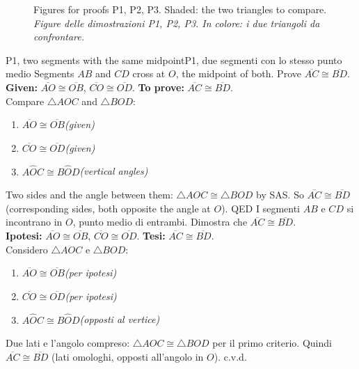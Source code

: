 \documentclass[10pt,a4paper,oneside]{book}
\newcommand{\bicap}[2]{\caption{#1\\{\color{itgreen}\itshape #2}}}
\newcommand{\ang}[3]{#1\widehat{#2}#3}      %
\newcommand{\seg}[1]{\overline{#1}}         %
\newcommand{\tri}[1]{\triangle #1}          %
\newcommand{\step}[2]{\item #1\hfill{\small\color{slate}\itshape(#2)}}
\newenvironment{steps}{\begin{enumerate}[label=\arabic*., leftmargin=1.5em, itemsep=1pt]}{\end{enumerate}}
\begin{document}
\begin{figure}[htbp]
\bicap{Figures for proofs P1, P2, P3. Shaded: the two triangles to compare.}%
      {Figure delle dimostrazioni P1, P2, P3. In colore: i due triangoli da confrontare.}
\label{fig:p123}
\end{figure}

\begin{proofbox}{P1, two segments with the same midpoint}{P1, due segmenti con lo stesso punto medio}
Segments $AB$ and $CD$ cross at $O$, the midpoint of both. Prove $\seg{AC} \cong \seg{BD}$.\\
\textbf{Given:} $\seg{AO} \cong \seg{OB}$, $\seg{CO} \cong \seg{OD}$. \textbf{To prove:} $\seg{AC} \cong \seg{BD}$.\\
Compare $\tri{AOC}$ and $\tri{BOD}$:
\begin{steps}
\step{$\seg{AO} \cong \seg{OB}$}{given}
\step{$\seg{CO} \cong \seg{OD}$}{given}
\step{$\ang{A}{O}{C} \cong \ang{B}{O}{D}$}{vertical angles}
\end{steps}
Two sides and the angle between them: $\tri{AOC} \cong \tri{BOD}$ by SAS. So $\seg{AC} \cong \seg{BD}$ (corresponding sides, both opposite the angle at $O$). \hfill QED
\tcblower
I segmenti $AB$ e $CD$ si incontrano in $O$, punto medio di entrambi. Dimostra che $\seg{AC} \cong \seg{BD}$.\\
\textbf{Ipotesi:} $\seg{AO} \cong \seg{OB}$, $\seg{CO} \cong \seg{OD}$. \textbf{Tesi:} $\seg{AC} \cong \seg{BD}$.\\
Considero $\tri{AOC}$ e $\tri{BOD}$:
\begin{steps}
\step{$\seg{AO} \cong \seg{OB}$}{per ipotesi}
\step{$\seg{CO} \cong \seg{OD}$}{per ipotesi}
\step{$\ang{A}{O}{C} \cong \ang{B}{O}{D}$}{opposti al vertice}
\end{steps}
Due lati e l'angolo compreso: $\tri{AOC} \cong \tri{BOD}$ per il primo criterio. Quindi $\seg{AC} \cong \seg{BD}$ (lati omologhi, opposti all'angolo in $O$). \hfill c.v.d.
\end{proofbox}
\end{document}
